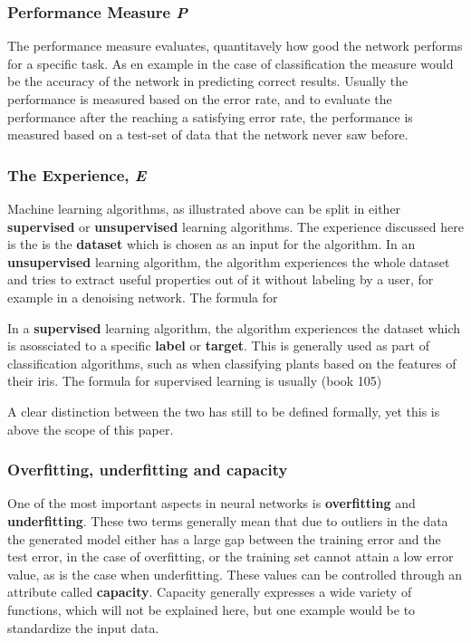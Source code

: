 \documentclass{article}
\begin{document}
\subsubsection{Performance Measure \textit{P}}

The performance measure evaluates, quantitavely how good the network performs for a specific task. As en example in the case of classification the measure would be the accuracy of the network in predicting correct results. Usually the performance is measured based on the error rate, and to evaluate the performance after the reaching a satisfying error rate, the performance is measured based on a test-set of data that the network never saw before.

\subsubsection{The Experience, \textit{E}}

Machine learning algorithms, as illustrated above can be split in either \textbf{supervised} or \textbf{unsupervised} learning algorithms. The experience discussed here is the is the \textbf{dataset} which is chosen as an input for the algorithm. In an \textbf{unsupervised} learning algorithm, the algorithm experiences the whole dataset and tries to extract useful properties out of it without labeling by a user, for example in a denoising network. The formula for 

In a \textbf{supervised} learning algorithm, the algorithm experiences the dataset which is asossciated to a specific \textbf{label} or \textbf{target}. This is generally used as part of classification algorithms, such as when classifying plants based on the features of their iris. The formula for supervised learning is usually (book 105)

A clear distinction between the two has still to be defined formally, yet this is above the scope of this paper.

\subsubsection{Overfitting, underfitting and capacity}

One of the most important aspects in neural networks is \textbf{overfitting} and \textbf{underfitting}. These two terms generally mean that due to outliers in the data the generated model either has a large gap between the training error and the test error, in the case of overfitting, or the training set cannot attain a low error value, as is the case when underfitting. These values can be controlled through an attribute called \textbf{capacity}. Capacity generally expresses a wide variety of functions, which will not be explained here, but one example would be to standardize the input data.
\end{document}
